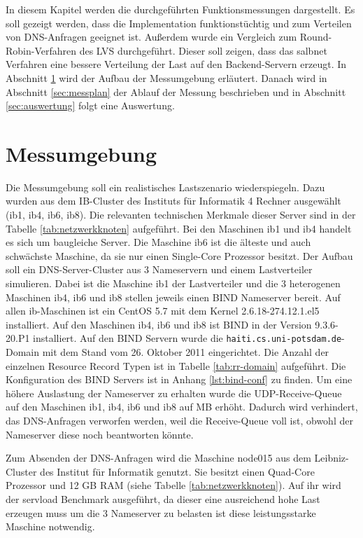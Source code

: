 \documentclass[a4paper, 12pt, BCOR10mm, DIV12, toc=bibliography, toc=listof, german]{scrbook}
\begin{document}
		In diesem Kapitel werden die durchgeführten Funktionsmessungen dargestellt. Es soll gezeigt
		werden, dass die Implementation funktionstüchtig und zum Verteilen von DNS-Anfragen geeignet
		ist. Außerdem wurde ein Vergleich zum Round-Robin-Verfahren des LVS durchgeführt. Dieser soll
		zeigen, dass das salbnet Verfahren eine bessere Verteilung der Last auf den Backend-Servern
		erzeugt. In Abschnitt \ref{sec:messumgebung} wird der Aufbau der Messumgebung erläutert. Danach
		wird in Abschnitt \ref{sec:messplan} der Ablauf der Messung beschrieben und in Abschnitt
		\ref{sec:auswertung} folgt eine Auswertung.

		\section{Messumgebung} %
		\label{sec:messumgebung}
	
		Die Messumgebung soll ein realistisches Lastszenario wiederspiegeln. Dazu wurden aus dem
		IB-Cluster des Instituts für Informatik 4 Rechner ausgewählt (ib1, ib4, ib6, ib8). Die
		relevanten technischen Merkmale dieser Server sind in der Tabelle \ref{tab:netzwerkknoten}
		aufgeführt. Bei den	Maschinen ib1 und ib4 handelt es sich um baugleiche Server. Die Maschine ib6
		ist die älteste und auch schwächste Maschine, da sie nur einen Single-Core Prozessor besitzt.
		Der Aufbau soll ein DNS-Server-Cluster aus 3 Nameservern und einem Lastverteiler simulieren.
		Dabei ist die Maschine ib1 der Lastverteiler und die 3 heterogenen Maschinen ib4, ib6 und ib8
		stellen jeweils einen BIND Nameserver bereit.	Auf allen ib-Maschinen ist ein CentOS 5.7 mit dem
		Kernel 2.6.18-274.12.1.el5 installiert.  Auf den Maschinen ib4, ib6 und ib8 ist BIND in der
		Version 9.3.6-20.P1 installiert. Auf den BIND Servern wurde die
		\texttt{haiti.cs.uni-potsdam.de}-Domain mit dem Stand vom 26. Oktober 2011 eingerichtet. Die
		Anzahl der einzelnen Resource Record Typen ist in Tabelle \ref{tab:rr-domain} aufgeführt. Die
		Konfiguration des BIND Servers ist in Anhang \ref{lst:bind-conf} zu finden. Um eine höhere
		Auslastung der Nameserver zu erhalten wurde die UDP-Receive-Queue auf den Maschinen ib1, ib4,
		ib6 und ib8 auf \unit[24]{MB} erhöht. Dadurch wird verhindert, das DNS-Anfragen verworfen
		werden, weil die Receive-Queue voll ist, obwohl der Nameserver diese noch beantworten könnte.
		
		Zum Absenden der DNS-Anfragen wird die Maschine node015 aus dem Leibniz-Cluster des Institut für
		Informatik genutzt. Sie besitzt einen Quad-Core Prozessor und 12 GB RAM (siehe Tabelle
		\ref{tab:netzwerkknoten}). Auf ihr wird der servload Benchmark ausgeführt, da dieser eine
		ausreichend hohe Last erzeugen muss um die 3 Nameserver zu belasten ist diese leistungsstarke
		Maschine notwendig.
\end{document}
